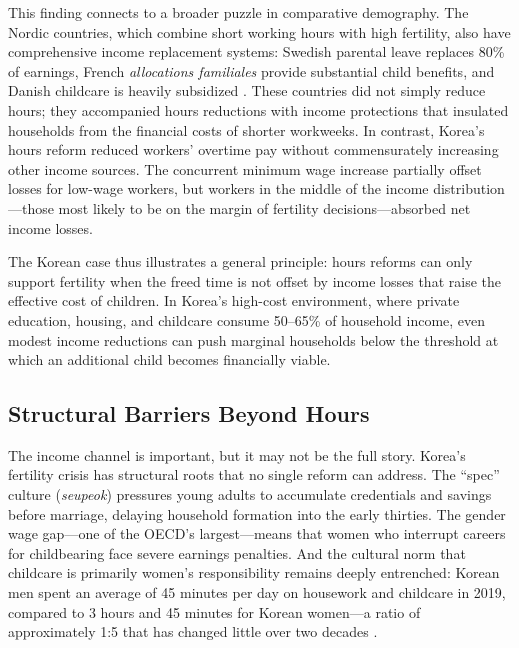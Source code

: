 \documentclass[12pt]{article}
\begin{document}
This finding connects to a broader puzzle in comparative demography. The Nordic countries, which combine short working hours with high fertility, also have comprehensive income replacement systems: Swedish parental leave replaces 80\% of earnings, French \textit{allocations familiales} provide substantial child benefits, and Danish childcare is heavily subsidized \citep{esping1999social, thevenon2011family}. These countries did not simply reduce hours; they accompanied hours reductions with income protections that insulated households from the financial costs of shorter workweeks. In contrast, Korea's hours reform reduced workers' overtime pay without commensurately increasing other income sources. The concurrent minimum wage increase partially offset losses for low-wage workers, but workers in the middle of the income distribution---those most likely to be on the margin of fertility decisions---absorbed net income losses.

The Korean case thus illustrates a general principle: hours reforms can only support fertility when the freed time is not offset by income losses that raise the effective cost of children. In Korea's high-cost environment, where private education, housing, and childcare consume 50--65\% of household income, even modest income reductions can push marginal households below the threshold at which an additional child becomes financially viable.

\subsection{Structural Barriers Beyond Hours}

The income channel is important, but it may not be the full story. Korea's fertility crisis has structural roots that no single reform can address. The ``spec'' culture (\textit{seupeok}) pressures young adults to accumulate credentials and savings before marriage, delaying household formation into the early thirties. The gender wage gap---one of the OECD's largest---means that women who interrupt careers for childbearing face severe earnings penalties. And the cultural norm that childcare is primarily women's responsibility remains deeply entrenched: Korean men spent an average of 45 minutes per day on housework and childcare in 2019, compared to 3 hours and 45 minutes for Korean women---a ratio of approximately 1:5 that has changed little over two decades \citep{goldscheider2015gender, raymo2015marriage}.
\end{document}
